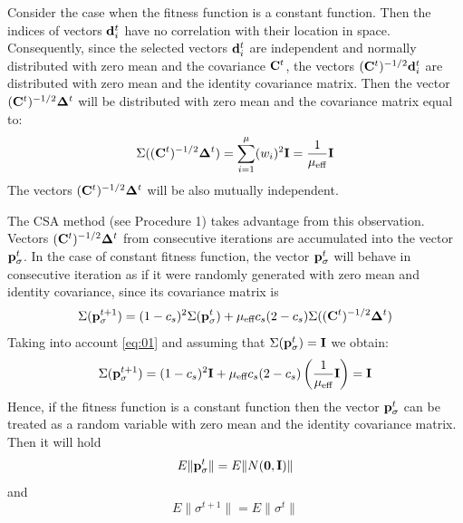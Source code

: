 \documentclass[runningheads,a4paper]{llncs}
\newcommand{\wek}[1]{
    {\bf #1} 
}
\newcommand{\mat}[1]{
    {\bf #1} 
}
\begin{document}
Consider the case when the fitness function is a constant function. Then the indices of vectors $\wek{d}_i^t$ have no correlation with their location in space. Consequently, since the selected vectors $\wek{d}_i^t$ are independent and normally distributed with zero mean and the covariance $\mat{C}^t$, the vectors $(\mat{C}^t)^{-1/2} \wek{d}_i^t$ are distributed with zero mean and the identity covariance matrix. Then the vector $(\mat{C}^t)^{-1/2} \wek{\Delta}^t$ will be distributed with zero mean and the covariance matrix equal to:
\begin{equation}
\Sigma((\mat{C}^t)^{-1/2} \wek{\Delta}^t) = \sum_{i=1}^\mu (w_i)^2 \mat{I}=\frac{1}{\mu_\text{eff}} \mat{I}
\label{eq:01}
\end{equation}
The vectors $(\mat{C}^t)^{-1/2} \wek{\Delta}^t$ will be also mutually independent. 



The CSA method (see Procedure 1) takes advantage from this observation. Vectors $(\mat{C}^t)^{-1/2} \wek{\Delta}^t$ from consecutive iterations are accumulated into the vector  $\wek{p}_\sigma^{t}$. In the case of constant fitness function, the vector $\wek{p}_\sigma^{t}$ will behave in consecutive iteration as if it were randomly generated with zero mean and identity covariance, since its covariance matrix is
\begin{equation}
\Sigma(\wek{p}_\sigma^{t+1}) = (1-c_s)^2 \Sigma(\wek{p}_\sigma^{t}) + \mu_\text{eff} c_s(2-c_s) \Sigma((\mat{C}^t)^{-1/2} \wek{\Delta}^t)
\end{equation}
Taking into account \eqref{eq:01} and assuming that $\Sigma(\wek{p}_\sigma^{t})=\mat{I}$ we obtain:
\begin{equation}
\Sigma(\wek{p}_\sigma^{t+1}) = (1-c_s)^2 \mat{I} + \mu_\text{eff} c_s(2-c_s) \left(\frac{1}{\mu_\text{eff}}\mat{I}\right) = \mat{I}
\end{equation}
Hence, if the fitness function is a constant function then the vector $\wek{p}_\sigma^{t}$ can be treated as a random variable with zero mean and the identity covariance matrix. Then it will hold
$$ E\|\wek{p}_\sigma^{t}\| = E\|N(\wek{0},\mat{I})\| $$
and 
$$ E\|\sigma^{t+1}\| = E\|\sigma^{t}\| $$
\end{document}
